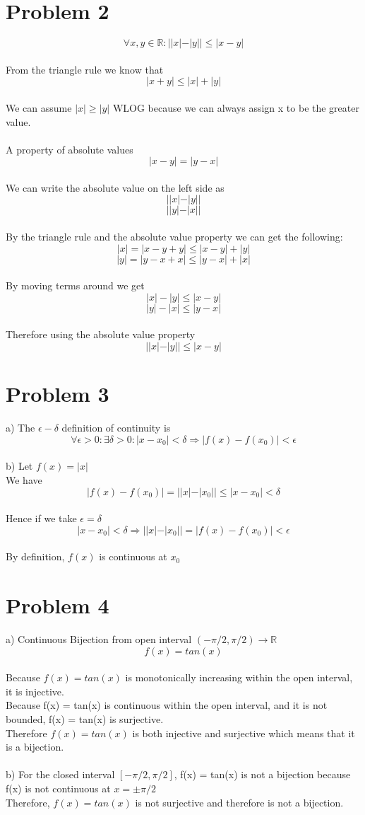 \documentclass{article}
\begin{document}
\section{Problem 2}
$$\forall x,y \in \mathbb{R} : ||x|-|y|| \leq |x-y|$$
\\From the triangle rule we know that $$|x+y|\leq |x|+|y|$$
\\We can assume $|x| \geq |y|$ WLOG because we can always assign x to be the greater value.
\\
\\A property of absolute values $$|x-y| = |y-x|$$
\\We can write the absolute value on the left side as $$||x|-|y||$$ $$||y|-|x||$$
\\By the triangle rule and the absolute value property we can get the following: $$|x|=|x-y+y|\leq|x-y|+|y|$$ $$|y|=|y-x+x|\leq|y-x|+|x|$$
\\By moving terms around we get $$|x|-|y|\leq|x-y|$$ $$|y|-|x|\leq|y-x|$$
\\Therefore using the absolute value property $$||x|-|y||\leq|x-y|$$
\section{Problem 3}
a) The $\epsilon-\delta$ definition of continuity is $$\forall \epsilon >0 : \exists \delta > 0 : |x-x_0| < \delta \Rightarrow |f(x)-f(x_0)| < \epsilon$$ 
\\b) Let $f(x) = |x|$
\\We have $$|f(x)-f(x_0)| = ||x|-|x_0|| \leq |x-x_0| < \delta$$
\\Hence if we take $\epsilon = \delta$ $$|x-x_0| < \delta \Rightarrow ||x|-|x_0|| = |f(x)-f(x_0)| < \epsilon$$
\\By definition, $f(x)$ is continuous at $x_0$

\section{Problem 4}
a) Continuous Bijection from open interval $(-\pi/2,\pi/2) \rightarrow \mathbb{R}$
\\$$f(x) = tan(x)$$
\\Because $f(x) = tan(x)$ is monotonically increasing within the open interval, it is injective.
\\Because f(x) = tan(x) is continuous within the open interval, and it is not bounded, f(x) = tan(x) is surjective.
\\Therefore $f(x) = tan(x)$ is both injective and surjective which means that it is a bijection.
\\
\\b) For the closed interval $[-\pi/2,\pi/2]$, f(x) = tan(x) is not a bijection because f(x) is not continuous at $x = \pm \pi/2$
\\Therefore, $f(x) = tan(x)$ is not surjective and therefore is not a bijection.
\end{document}
